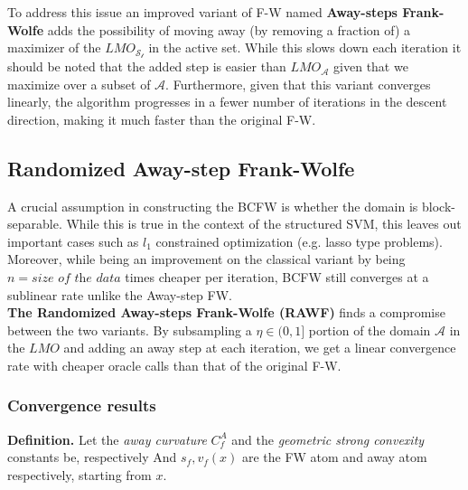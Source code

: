 To address this issue an improved variant of F-W named \textbf{Away-steps
Frank-Wolfe} adds the possibility of moving away (by removing a fraction of) a
maximizer of the $LMO_{\mathcal{S_{t}}}$ in the active set. While this slows
down each iteration it should be noted that the added step is easier than
$LMO_{\mathcal{A}}$ given that we maximize over a subset of $\mathcal{A}$.
Furthermore, given that this variant converges linearly, the algorithm
progresses in a fewer number of iterations in the descent direction, making it
much faster than the original F-W.




\subsection{Randomized Away-step Frank-Wolfe}
A crucial assumption in constructing the BCFW is whether the domain is
block-separable. While this is true in the context of the structured SVM, this
leaves out important cases such as $l_{1}$ constrained optimization (e.g. lasso
type problems). \\
Moreover, while being an improvement on the classical variant by being
$n=\textit{size of the data}$ times cheaper per iteration, BCFW still converges
at a sublinear rate unlike the Away-step FW.\\

\textbf{The Randomized Away-steps Frank-Wolfe (RAWF)} finds a compromise between
the two variants. By subsampling a $\eta\in(0,1]$ portion of the domain
$\mathcal{A}$ in the $LMO$ and adding an away step at each iteration, we get a
linear convergence rate with cheaper oracle calls than that of the original F-W.
\subsubsection{Convergence results}
\textbf{Definition.}
Let the \textit{away curvature} $C^{A}_{f}$ and the \textit{geometric strong convexity} constants be, respectively
And $s_{f}, v_{f}(x)$ are the FW atom and away atom respectively, starting from $x$.\\

